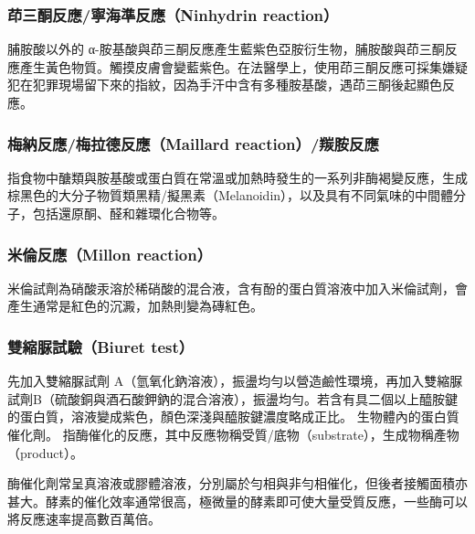 \documentclass[a4paper,12pt]{report}
\begin{document}
\begin{itemize}
\begin{itemize}
\subsubsection{茚三酮反應/寧海準反應（Ninhydrin reaction）}
脯胺酸以外的 α-胺基酸與茚三酮反應產生藍紫色亞胺衍生物，脯胺酸與茚三酮反應產生黃色物質。觸摸皮膚會變藍紫色。在法醫學上，使用茚三酮反應可採集嫌疑犯在犯罪現場留下來的指紋，因為手汗中含有多種胺基酸，遇茚三酮後起顯色反應。
\subsubsection{梅納反應/梅拉德反應（Maillard reaction）/羰胺反應}
指食物中醣類與胺基酸或蛋白質在常溫或加熱時發生的一系列非酶褐變反應，生成棕黑色的大分子物質類黑精/擬黑素（Melanoidin），以及具有不同氣味的中間體分子，包括還原酮、醛和雜環化合物等。
\subsubsection{米倫反應（Millon reaction）}
米倫試劑為硝酸汞溶於稀硝酸的混合液，含有酚的蛋白質溶液中加入米倫試劑，會產生通常是紅色的沉澱，加熱則變為磚紅色。
\subsubsection{雙縮脲試驗（Biuret test）}
先加入雙縮脲試劑 A（氫氧化鈉溶液），振盪均勻以營造鹼性環境，再加入雙縮脲試劑B（硫酸銅與酒石酸鉀鈉的混合溶液），振盪均勻。若含有具二個以上醯胺鍵的蛋白質，溶液變成紫色，顏色深淺與醯胺鍵濃度略成正比。
生物體內的蛋白質催化劑。
指酶催化的反應，其中反應物稱受質/底物（substrate），生成物稱產物（product）。

酶催化劑常呈真溶液或膠體溶液，分別屬於勻相與非勻相催化，但後者接觸面積亦甚大。酵素的催化效率通常很高，極微量的酵素即可使大量受質反應，一些酶可以將反應速率提高數百萬倍。


\end{itemize}
\end{itemize}
\end{document}
